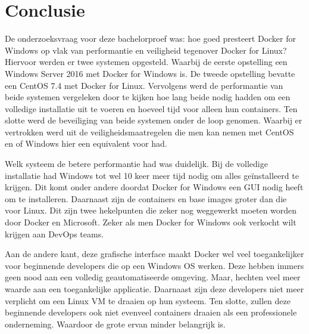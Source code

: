 
\chapter{Conclusie}
\label{ch:conclusie}


De onderzoeksvraag voor deze bachelorproef was: hoe goed presteert Docker for Windows op vlak van performantie en veiligheid tegenover Docker for Linux? Hiervoor werden er twee systemen opgesteld. Waarbij de eerste opstelling een Windows Server 2016 met Docker for Windows is. De tweede opstelling bevatte een CentOS 7.4 met Docker for Linux. Vervolgens werd de performantie van beide systemen vergeleken door te kijken hoe lang beide nodig hadden om een volledige installatie uit te voeren en hoeveel tijd voor alleen hun containers. Ten slotte werd de beveiliging van beide systemen onder de loop genomen. Waarbij er vertrokken werd uit de veiligheidsmaatregelen die men kan nemen met CentOS en of Windows hier een equivalent voor had. 

Welk systeem de betere performantie had was duidelijk. Bij de volledige installatie had Windows tot wel 10 keer meer tijd nodig om alles geïnstalleerd te krijgen. Dit komt onder andere doordat Docker for Windows een GUI nodig heeft om te installeren. Daarnaast zijn de containers en base images groter dan die voor Linux. Dit zijn twee hekelpunten die zeker nog weggewerkt moeten worden door Docker en Microsoft. Zeker als men Docker for Windows ook verkocht wilt krijgen aan DevOps teams.

Aan de andere kant, deze grafische interface maakt Docker wel veel toegankelijker voor beginnende developers die op een Windows OS werken. Deze hebben immers geen nood aan een volledig geautomatiseerde omgeving. Maar, hechten veel meer waarde aan een toegankelijke applicatie. Daarnaast zijn deze developers niet meer verplicht om een Linux VM te draaien op hun systeem. Ten slotte, zullen deze beginnende developers ook niet evenveel containers draaien als een professionele onderneming. Waardoor de grote ervan minder belangrijk is.

